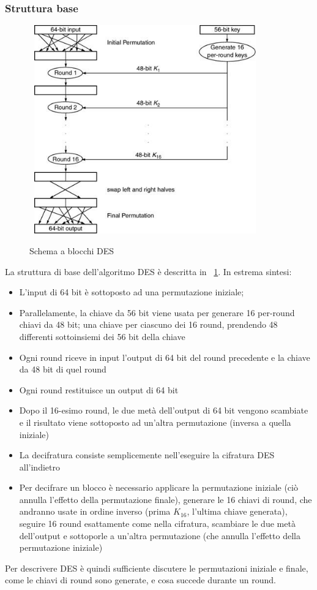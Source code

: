 \subsubsection{Struttura base}
\begin{figure}[htbp]
	\centering%
	\subfigure%
	{\includegraphics[height=9cm, width=10cm, keepaspectratio]{Immagini/chiave_segreta/des_structure.png}}
	\caption{Schema a blocchi DES \label{fig:des_struct}} 	
\end{figure}
La struttura di base dell'algoritmo DES è descritta in \figurename ~\ref{fig:des_struct}. In estrema sintesi:
\begin{itemize}
  \item L'input di 64 bit è sottoposto ad una permutazione iniziale;
  \item Parallelamente, la chiave da 56 bit viene usata per generare 16 per-round chiavi da 48 bit; una chiave per ciascuno dei 16 round, prendendo 48 differenti sottoinsiemi dei 56 bit della chiave
  \item Ogni round riceve in input l'output di 64 bit del round precedente e la chiave da 48 bit di quel round
  \item Ogni round restituisce un output di 64 bit
  \item Dopo il 16-esimo round, le due metà dell'output di 64 bit vengono scambiate e il risultato viene sottoposto ad un’altra permutazione (inversa a quella iniziale)
  \item La decifratura consiste semplicemente nell’eseguire la cifratura DES all’indietro
  \item Per decifrare un blocco è necessario applicare la permutazione iniziale (ciò annulla l’effetto della permutazione finale), generare le 16 chiavi di round, che andranno usate in ordine inverso (prima $K_{16}$, l'ultima chiave generata), seguire 16 round esattamente come nella cifratura, scambiare le due metà dell'output e sottoporle a un'altra permutazione (che annulla l'effetto della permutazione iniziale)
\end{itemize}
Per descrivere DES è quindi sufficiente discutere le permutazioni iniziale e finale, come le chiavi di round sono generate, e cosa succede durante un round.


